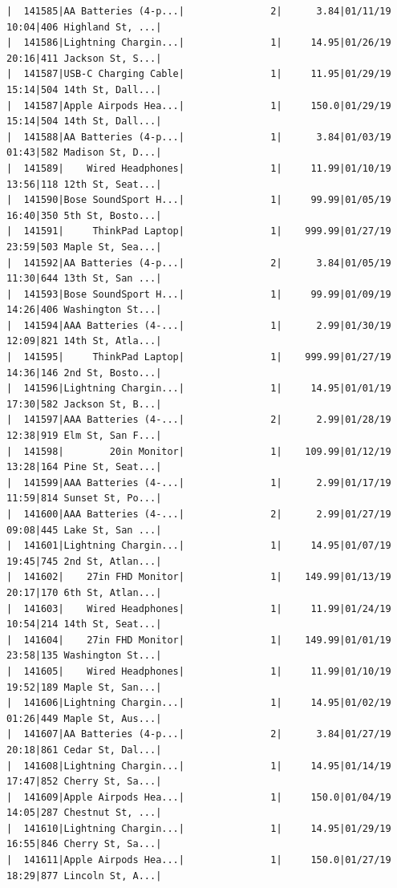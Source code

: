 \documentclass[
  letterpaper,
  DIV=11,
  numbers=noendperiod]{scrartcl}
\begin{document}
\begin{verbatim}
|  141585|AA Batteries (4-p...|               2|      3.84|01/11/19 10:04|406 Highland St, ...|
|  141586|Lightning Chargin...|               1|     14.95|01/26/19 20:16|411 Jackson St, S...|
|  141587|USB-C Charging Cable|               1|     11.95|01/29/19 15:14|504 14th St, Dall...|
|  141587|Apple Airpods Hea...|               1|     150.0|01/29/19 15:14|504 14th St, Dall...|
|  141588|AA Batteries (4-p...|               1|      3.84|01/03/19 01:43|582 Madison St, D...|
|  141589|    Wired Headphones|               1|     11.99|01/10/19 13:56|118 12th St, Seat...|
|  141590|Bose SoundSport H...|               1|     99.99|01/05/19 16:40|350 5th St, Bosto...|
|  141591|     ThinkPad Laptop|               1|    999.99|01/27/19 23:59|503 Maple St, Sea...|
|  141592|AA Batteries (4-p...|               2|      3.84|01/05/19 11:30|644 13th St, San ...|
|  141593|Bose SoundSport H...|               1|     99.99|01/09/19 14:26|406 Washington St...|
|  141594|AAA Batteries (4-...|               1|      2.99|01/30/19 12:09|821 14th St, Atla...|
|  141595|     ThinkPad Laptop|               1|    999.99|01/27/19 14:36|146 2nd St, Bosto...|
|  141596|Lightning Chargin...|               1|     14.95|01/01/19 17:30|582 Jackson St, B...|
|  141597|AAA Batteries (4-...|               2|      2.99|01/28/19 12:38|919 Elm St, San F...|
|  141598|        20in Monitor|               1|    109.99|01/12/19 13:28|164 Pine St, Seat...|
|  141599|AAA Batteries (4-...|               1|      2.99|01/17/19 11:59|814 Sunset St, Po...|
|  141600|AAA Batteries (4-...|               2|      2.99|01/27/19 09:08|445 Lake St, San ...|
|  141601|Lightning Chargin...|               1|     14.95|01/07/19 19:45|745 2nd St, Atlan...|
|  141602|    27in FHD Monitor|               1|    149.99|01/13/19 20:17|170 6th St, Atlan...|
|  141603|    Wired Headphones|               1|     11.99|01/24/19 10:54|214 14th St, Seat...|
|  141604|    27in FHD Monitor|               1|    149.99|01/01/19 23:58|135 Washington St...|
|  141605|    Wired Headphones|               1|     11.99|01/10/19 19:52|189 Maple St, San...|
|  141606|Lightning Chargin...|               1|     14.95|01/02/19 01:26|449 Maple St, Aus...|
|  141607|AA Batteries (4-p...|               2|      3.84|01/27/19 20:18|861 Cedar St, Dal...|
|  141608|Lightning Chargin...|               1|     14.95|01/14/19 17:47|852 Cherry St, Sa...|
|  141609|Apple Airpods Hea...|               1|     150.0|01/04/19 14:05|287 Chestnut St, ...|
|  141610|Lightning Chargin...|               1|     14.95|01/29/19 16:55|846 Cherry St, Sa...|
|  141611|Apple Airpods Hea...|               1|     150.0|01/27/19 18:29|877 Lincoln St, A...|

\end{verbatim}
\end{document}
